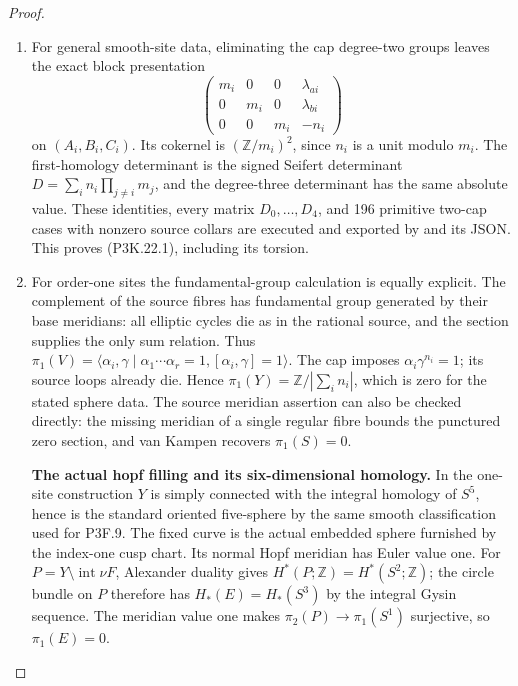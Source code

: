 \begin{proof}
\begin{enumerate}[label=\arabic*.]
\item For general smooth-site data, eliminating the cap degree-two groups
leaves the exact block presentation
\[
 \begin{pmatrix}
 m_i&0&0&\lambda_{ai}\\
 0&m_i&0&\lambda_{bi}\\
 0&0&m_i&-n_i
 \end{pmatrix}                                                   \tag{P3K.22.7}
\]
on \((A_i,B_i,C_i)\).  Its cokernel is
\((\mathbb Z/m_i)^2\), since \(n_i\) is a unit modulo \(m_i\).
The first-homology determinant is the signed Seifert determinant
\(D=\sum_i n_i\prod_{j\ne i}m_j\), and the degree-three
determinant has the same absolute value.  These identities, every
matrix \(D_0,\ldots,D_4\), and 196 primitive two-cap cases with
nonzero source collars are executed and exported by
 and its JSON.
This proves (P3K.22.1), including its torsion.

\item For order-one sites the fundamental-group calculation is equally
explicit.  The complement of the source fibres has fundamental
group generated by their base meridians: all elliptic cycles die
as in the rational source, and the section supplies the only sum
relation.  Thus
\(\pi_1(V)=\langle\alpha_i,\gamma\mid
\alpha_1\cdots\alpha_r=1,[\alpha_i,\gamma]=1\rangle\).
The cap imposes \(\alpha_i\gamma^{n_i}=1\); its source loops
already die.  Hence \(\pi_1(Y)=\mathbb Z/|\sum_i n_i|\), which
is zero for the stated sphere data.  The source meridian assertion
can also be checked directly: the missing meridian of a single
regular fibre bounds the punctured zero section, and van Kampen
recovers \(\pi_1(S)=0\).

\par\medskip\noindent\textbf{The actual hopf filling and its six-dimensional homology.}\enspace
In the one-site construction \(Y\) is simply connected with the
integral homology of \(S^5\), hence is the standard oriented
five-sphere by the same smooth classification used for P3F.9.
The fixed curve is the actual embedded sphere furnished by the
index-one cusp chart.  Its normal Hopf meridian has Euler value one.
For \(P=Y\setminus\operatorname{int}\nu F\), Alexander duality
gives \(H^*(P;\mathbb Z)=H^*(S^2;\mathbb Z)\); the circle
bundle on \(P\) therefore has \(H_*(E)=H_*(S^3)\) by the
integral Gysin sequence.  The meridian value one makes
\(\pi_2(P)\to\pi_1(S^1)\) surjective, so \(\pi_1(E)=0\).


\end{enumerate}
\end{proof}
